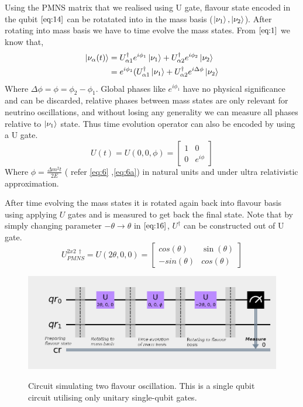 \documentclass[12pt,a4paper]{report}
\begin{document}
Using the PMNS matrix that we realised using U gate, flavour state encoded in the qubit $\ref{eq:14}$ can be rotatated into in the mass basis ($\ket{\nu_{1}},\ket{\nu_{2}}$). After rotating into mass basis we have to time evolve the mass states. From $\ref{eq:1}$ we know that,
\begin{gather*}
\begin{split}
\ket{\nu_{\alpha}(t)}& = U_{\alpha 1}^{\dagger}e^{i\phi_{1}}\ket{\nu_{1}} + U_{\alpha 2}^{\dagger}e^{i\phi_{2}}\ket{\nu_{2}}\\
&=e^{i\phi_{1}}( U_{\alpha 1}^{\dagger}\ket{\nu_{1}} + U_{\alpha 2}^{\dagger} e^{ i\Delta\phi}\ket{\nu_{2}}
\end{split}
\end{gather*}
Where $\Delta\phi=\phi = \phi_{2}-\phi_{1}$.
Global phases like $e^{i\phi_{1}}$ have no physical significance and can be discarded\cite{Benenti}, relative phases between mass states are only relevant for neutrino oscillations, and without losing any generality we can measure all phases relative to $\ket{\nu_{1}}$ state. Thus time evolution operator can also be encoded by using a U gate.
\begin{equation}
U(t) = U(0,0,\phi) = \begin{bmatrix} 1 & 0 \\ 0 & e^{i\phi} \end{bmatrix}
\end{equation}
Where $\phi = \frac {\Delta m^{2} t}{2E}$ ( refer \ref{eq:6} ,\ref{eq:6a}) in natural units and under ultra relativistic approximation.\par
After time evolving the mass states it is rotated again back into flavour basis using applying $U$ gates and is measured to get back the final state. Note that by simply changing parameter $-\theta \rightarrow \theta$ in $\ref{eq:16}$, $U^{\dagger}$ can be constructed out of U gate. 
\begin{equation}
U_{PMNS}^{2x2 \ \dagger}= U(2\theta,0,0) = \begin{bmatrix} cos(\theta) & \sin(\theta) \\ -sin(\theta) & cos(\theta) \end{bmatrix}
\end{equation}
\begin{figure}[h]
\graphicspath{ {./Images/} }
\centering	
{\includegraphics[width=\textwidth]{fig_2.png}}
\caption{Circuit simulating two flavour oscillation\cite{jones}. This is a single qubit circuit utilising only unitary single-qubit gates. }
\label{fig 2}
\end{figure}
\end{document}
